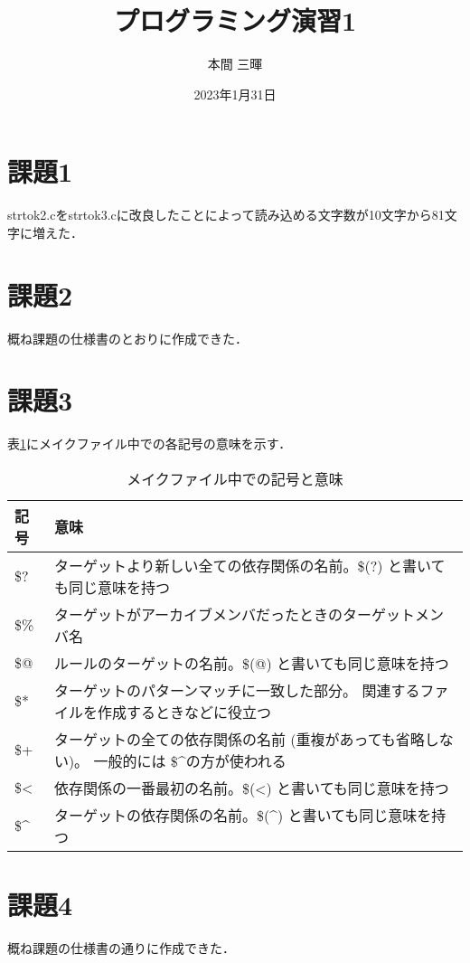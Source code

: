 \documentclass[titlepage]{jarticle}
\title{プログラミング演習1}
\author{本間 三暉}
\date{2023年1月31日}
\begin{document}
\maketitle
\section*{課題1}
strtok2.cをstrtok3.cに改良したことによって読み込める文字数が10文字から81文字に増えた．
\section*{課題2}
概ね課題の仕様書のとおりに作成できた．
\section*{課題3}
表\ref{tab}にメイクファイル中での各記号の意味を示す．
\begin{table}[H]
  \caption{メイクファイル中での記号と意味}
  \label{tab}
  \centering
  \begin{tabular}{l|l}
    記号                   & 意味                                                                \\\hline\hline
    \$?                  & ターゲットより新しい全ての依存関係の名前。\$(?) と書いても同じ意味を持つ                           \\
    \$\%                 & ターゲットがアーカイブメンバだったときのターゲットメンバ名                                     \\
    \$@                  & ルールのターゲットの名前。\$(@) と書いても同じ意味を持つ                                   \\
    \$*                  & ターゲットのパターンマッチに一致した部分。 関連するファイルを作成するときなどに役立つ                       \\
    \$+                  & ターゲットの全ての依存関係の名前 (重複があっても省略しない)。 一般的には \$\textasciicircum の方が使われる \\
    \$\textless{}        & 依存関係の一番最初の名前。\$(\textless{}) と書いても同じ意味を持つ                         \\
    \$\textasciicircum{} & ターゲットの依存関係の名前。\$(\textasciicircum{}) と書いても同じ意味を持つ
  \end{tabular}
\end{table}
\section*{課題4}
概ね課題の仕様書の通りに作成できた．
\end{document}
